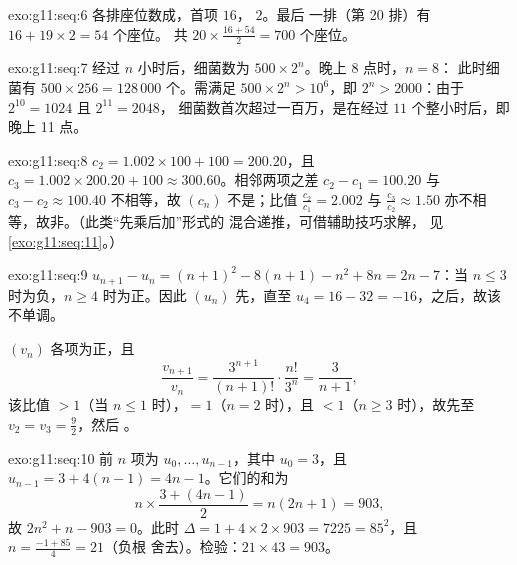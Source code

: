 \begin{solution}{exo:g11:seq:6}
各排座位数成，首项 $16$， $2$。最后
一排（第 20 排）有 $16 + 19 \times 2 = 54$ 个座位。
共 $20 \times \frac{16 + 54}{2} = 700$ 个座位。
\end{solution}

\begin{solution}{exo:g11:seq:7}
经过 $n$ 小时后，细菌数为 $500 \times 2^n$。晚上 8 点时，$n = 8$：
此时细菌有 $500 \times 256 = 128\,000$ 个。需满足 $500 \times 2^n >
10^6$，即 $2^n > 2000$：由于 $2^{10} = 1024$ 且 $2^{11} = 2048$，
细菌数首次超过一百万，是在经过 $11$ 个整小时后，即晚上 11 点。
\end{solution}

\begin{solution}{exo:g11:seq:8}
$c_2 = 1.002 \times 100 + 100 = 200.20$，且
$c_3 = 1.002 \times 200.20 + 100 \approx 300.60$。相邻两项之差
$c_2 - c_1 = 100.20$ 与 $c_3 - c_2 \approx 100.40$ 不相等，故
$(c_n)$ 不是；比值 $\frac{c_2}{c_1} = 2.002$ 与
$\frac{c_3}{c_2} \approx 1.50$ 亦不相等，故非。（此类“先乘后加”形式的
混合递推，可借辅助技巧求解，
见\cref{exo:g11:seq:11}。）
\end{solution}

\begin{solution}{exo:g11:seq:9}
$u_{n+1} - u_n = (n+1)^2 - 8(n+1) - n^2 + 8n = 2n - 7$：当
$n \leq 3$ 时为负，$n \geq 4$ 时为正。因此 $(u_n)$ 先，直至
$u_4 = 16 - 32 = -16$，之后，故该不单调。

$(v_n)$ 各项为正，且
\[
\frac{v_{n+1}}{v_n} = \frac{3^{n+1}}{(n+1)!} \cdot \frac{n!}{3^n}
= \frac{3}{n+1},
\]
该比值 $> 1$（当 $n \leq 1$ 时），$= 1$（$n = 2$ 时），且
$< 1$（$n \geq 3$ 时），故先至 $v_2 = v_3 = \frac92$，然后
。
\end{solution}

\begin{solution}{exo:g11:seq:10}
前 $n$ 项为 $u_0, \dots, u_{n-1}$，其中 $u_0 = 3$，且
$u_{n-1} = 3 + 4(n-1) = 4n - 1$。它们的和为
\[
n \times \frac{3 + (4n-1)}{2} = n(2n + 1) = 903,
\]
故 $2n^2 + n - 903 = 0$。此时 $\Delta = 1 + 4 \times 2 \times 903 =
7225 = 85^2$，且 $n = \frac{-1 + 85}{4} = 21$（负根
舍去）。检验：$21 \times 43 = 903$。
\end{solution}

